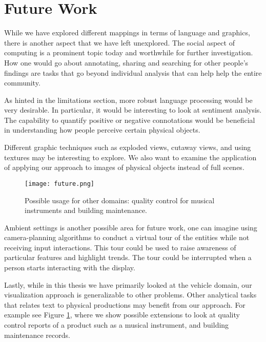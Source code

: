  

\section{Future Work}
While we have explored different mappings in terms of language and graphics,
there is another aspect that we have left unexplored. The social aspect of
computing is a prominent topic today and worthwhile for further investigation.
How one would go about annotating, sharing and searching for other people's
findings are tasks that go beyond individual analysis that can help help the
entire community.


As hinted in the limitations section, more robust language processing would be very
desirable. In particular, it would be interesting to look at sentiment analysis.
The capability to quantify positive or negative connotations would be beneficial
in understanding how people perceive certain physical objects. 

Different graphic techniques such as exploded views, cutaway views, and using textures may be interesting
to explore. We also want to examine the application of applying our approach to \twod images of physical 
objects instead of full \threed scenes.

	\begin{figure}
	 \centering  
	 \texttt{[image: future.png]}  
	 \caption[Other Uses.]{Possible usage for other domains: quality control for
	 musical instruments and building maintenance.}
	 \label{figure:future}
	\end{figure}

Ambient settings is another possible area for future work, one can imagine using
camera-planning algorithms to conduct a virtual tour of the entities while not
receiving input interactions. This tour could be used to raise awareness of
particular features and highlight trends. The tour could be interrupted when a
person starts interacting with the display.

Lastly, while in this thesis we have primarily looked at the vehicle domain, our
visualization approach is generalizable to other problems. Other analytical
tasks that relates text to physical productions may benefit from our approach. For
example see Figure \ref{figure:future}, where we show possible extensions
to look at quality control reports of a product such as a musical instrument,
and building maintenance records.


